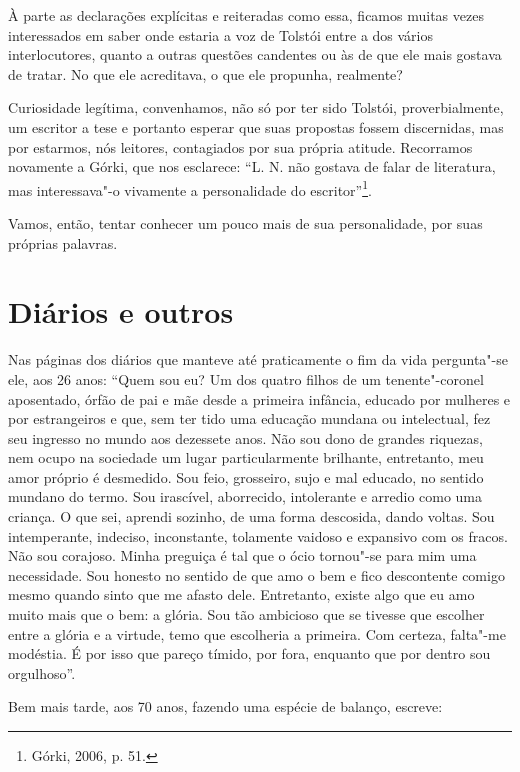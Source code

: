 {{À parte as declarações explícitas e reiteradas como essa, ficamos muitas
vezes interessados em saber onde estaria a voz de Tolstói entre a dos
vários interlocutores, quanto a outras questões candentes ou às de que
ele mais gostava de tratar. No que ele acreditava, o que ele propunha,
realmente?

Curiosidade legítima, convenhamos, não só por ter sido Tolstói,
proverbialmente, um escritor a tese e portanto esperar que suas
propostas fossem discernidas, mas por estarmos, nós leitores,
contagiados por sua própria atitude. Recorramos novamente a
Górki, que nos esclarece: ``L. N. não gostava
de falar de literatura, mas interessava"-o vivamente a personalidade do
escritor''\footnote{Górki, 2006, p. 51.}.

Vamos, então, tentar conhecer um pouco mais de sua personalidade, por
suas próprias palavras.

\chapter{Diários e outros}

Nas páginas dos diários que manteve até praticamente o fim da vida
pergunta"-se ele, aos 26 anos: ``Quem sou eu? Um dos quatro filhos de um
tenente"-coronel aposentado, órfão de pai e mãe desde a primeira
infância, educado por mulheres e por estrangeiros e que, sem ter tido
uma educação mundana ou intelectual, fez seu ingresso no mundo aos
dezessete anos. Não sou dono de grandes riquezas, nem ocupo na sociedade
um lugar particularmente brilhante, entretanto, meu amor próprio é
desmedido. Sou feio, grosseiro, sujo e mal educado, no sentido mundano
do termo. Sou irascível, aborrecido, intolerante e arredio como uma
criança. O que sei, aprendi sozinho, de uma forma descosida, dando
voltas. Sou intemperante, indeciso, inconstante, tolamente vaidoso e
expansivo com os fracos. Não sou corajoso. Minha preguiça é tal que o
ócio tornou"-se para mim uma necessidade. Sou honesto no sentido de que
amo o bem e fico descontente comigo mesmo quando sinto que me afasto
dele. Entretanto, existe algo que eu amo muito mais que o bem: a glória.
Sou tão ambicioso que se tivesse que escolher entre a glória e a
virtude, temo que escolheria a primeira. Com certeza, falta"-me modéstia.
É por isso que pareço tímido, por fora, enquanto que por dentro sou
orgulhoso''.

Bem mais tarde, aos 70 anos, fazendo uma espécie de balanço, escreve:

}}
